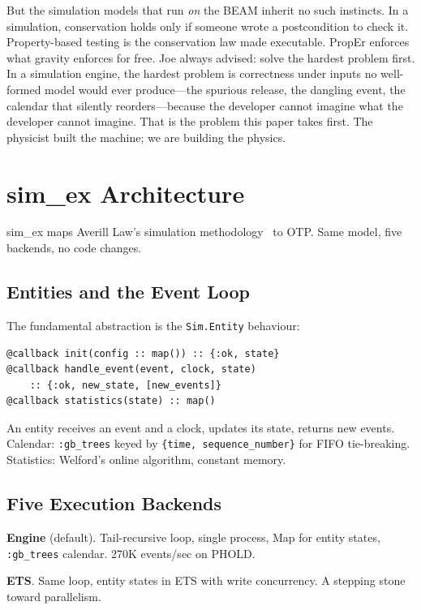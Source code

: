 \documentclass[sigplan,review,anonymous=false]{acmart}
\begin{document}
But the simulation models that run \emph{on} the BEAM inherit no such
instincts. In a simulation, conservation holds only if someone wrote a
postcondition to check it. Property-based testing is the conservation
law made executable. PropEr enforces what gravity enforces for free. Joe
always advised: solve the hardest problem first. In a simulation engine,
the hardest problem is correctness under inputs no well-formed model
would ever produce---the spurious release, the dangling event, the
calendar that silently reorders---because the developer cannot imagine
what the developer cannot imagine. That is the problem this paper takes
first. The physicist built the machine; we are building the physics.


\section{sim\_ex Architecture}

sim\_ex maps Averill Law's simulation methodology~\cite{law2014} to OTP.
Same model, five backends, no code changes.

\subsection{Entities and the Event Loop}

The fundamental abstraction is the \texttt{Sim.Entity} behaviour:

\begin{lstlisting}
@callback init(config :: map()) :: {:ok, state}
@callback handle_event(event, clock, state)
    :: {:ok, new_state, [new_events]}
@callback statistics(state) :: map()
\end{lstlisting}

An entity receives an event and a clock, updates its state, returns new
events. Calendar: \texttt{:gb\_trees} keyed by \texttt{\{time,
sequence\_number\}} for FIFO tie-breaking. Statistics: Welford's online
algorithm, constant memory.

\subsection{Five Execution Backends}

\textbf{Engine} (default). Tail-recursive loop, single process, Map for
entity states, \texttt{:gb\_trees} calendar. 270K events/sec on PHOLD.

\textbf{ETS}. Same loop, entity states in ETS with write concurrency.
A stepping stone toward parallelism.
\end{document}
